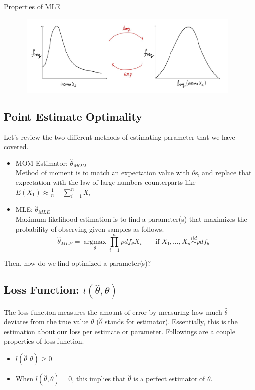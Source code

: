 \documentclass[12pt]{article}
\begin{document}
\begin{section}{Properties of MLE}
\begin{figure}
    \centering
    \includegraphics[height=4cm, width=12cm]{a.png}
\end{figure}
\section{Point Estimate Optimality}
Let's review the two different methods of estimating parameter that we have covered.
\begin{itemize}
	\item MOM Estimator: $\hat{\theta}_{MOM}$\\
    Method of moment is to match an expectation value with $\theta$s, and replace that expectation with the law of large numbers counterparts like $E(X_1) \approx \frac{1}{n}- \sum_{i=1}^n X_i$ 
    \item MLE: $\hat{\theta}_{MLE}$\\
    Maximum likelihood estimation is to find a parameter(s) that maximizes the probability of observing given samples as follows.
    $$\hat{\theta}_{MLE} = \operatorname*{argmax}_\theta \prod_{i=1}^n pdf_{\theta}X_i \qquad\text{if}\; X_1,...,X_n \stackrel{iid}{\sim} pdf_\theta$$
\end{itemize}
Then, how do we find optimized a parameter(s)? 

\subsection{Loss Function: $l(\hat{\theta},\theta)$}
The loss function measures the amount of error by measuring how much $\hat{\theta}$ deviates from the true value $\theta$ ($\hat{\theta}$ stands for estimator). Essentially, this is the estimation about our loss per estimate or parameter. Followings are a couple properties of loss function.
\begin{itemize}
	\item $l(\hat{\theta},\theta) \geq 0$
    \item When $l(\hat{\theta},\theta) = 0$, this implies that $\hat{\theta}$ is a perfect estimator of $\theta$.
\end{itemize}


\end{section}
\end{document}
